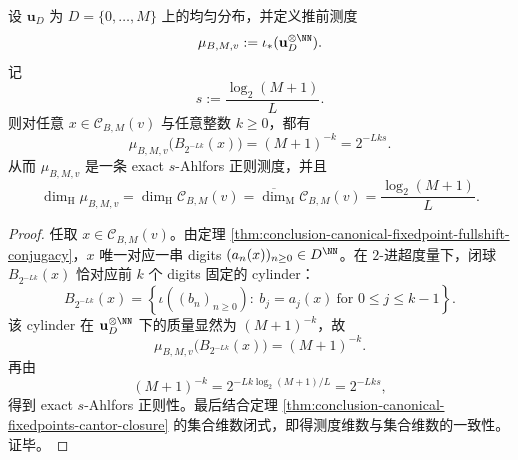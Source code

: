 \begin{theorem}\label{thm:conclusion-canonical-fixedpoint-exact-ahlfors-regularity}
设 \(\mathbf u_D\) 为 \(D=\{0,\dots,M\}\) 上的均匀分布，并定义推前测度
\[
\mu_{B,M,v}:=\iota_*(\mathbf u_D^{\otimes \NN}).
\]
记
\[
s:=\frac{\log_2(M+1)}{L}.
\]
则对任意 \(x\in \mathcal C_{B,M}(v)\) 与任意整数 \(k\ge 0\)，都有
\[
\mu_{B,M,v}\bigl(B_{2^{-Lk}}(x)\bigr)=(M+1)^{-k}=2^{-Lks}.
\]
从而 \(\mu_{B,M,v}\) 是一条 exact \(s\)-Ahlfors 正则测度，并且
\[
\dim_{\mathrm H}\mu_{B,M,v}
=
\dim_{\mathrm H}\mathcal C_{B,M}(v)
=
\overline{\dim}_{\mathrm M}\mathcal C_{B,M}(v)
=
\frac{\log_2(M+1)}{L}.
\]
\end{theorem}
\begin{proof}
任取 \(x\in \mathcal C_{B,M}(v)\)。由定理 \ref{thm:conclusion-canonical-fixedpoint-fullshift-conjugacy}，\(x\) 唯一对应一串 digits \((a_n(x))_{n\ge 0}\in D^{\NN}\)。在 \(2\)-进超度量下，闭球 \(B_{2^{-Lk}}(x)\) 恰对应前 \(k\) 个 digits 固定的 cylinder：
\[
B_{2^{-Lk}}(x)
=
\left\{
\iota((b_n)_{n\ge 0}):\ b_j=a_j(x)\ \text{for }0\le j\le k-1
\right\}.
\]
该 cylinder 在 \(\mathbf u_D^{\otimes\NN}\) 下的质量显然为 \((M+1)^{-k}\)，故
\[
\mu_{B,M,v}\bigl(B_{2^{-Lk}}(x)\bigr)=(M+1)^{-k}.
\]
再由
\[
(M+1)^{-k}=2^{-Lk\log_2(M+1)/L}=2^{-Lks},
\]
得到 exact \(s\)-Ahlfors 正则性。最后结合定理 \ref{thm:conclusion-canonical-fixedpoints-cantor-closure} 的集合维数闭式，即得测度维数与集合维数的一致性。证毕。
\end{proof}

